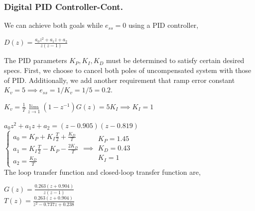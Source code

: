 \documentclass[mathserif, 10pt]{beamer} %
\begin{document}
\frame
{

\small
\frametitle{Digital PID Controller-Cont.}

We can achieve both goals while $e_{ss}=0$ using a PID controller,  \\ \vspace{.07in}

$D(z)= \frac{a_0z^2+a_1z+a_2}{z(z-1)}$ \\ \vspace{.1in}

The PID parameters $K_P,K_I,K_D$  must be determined to satisfy certain desired specs.
First, we choose to cancel both poles of uncompensated system with those of PID. Additionally,
we add another requirement that ramp error constant \\ \vspace{.07in}
 $K_v=5 \implies e_{ss}=1/K_v=1/5=0.2$. \\ \vspace{.07in}

$K_v=\frac{1}{T} \lim\limits_{z\to1}(1-z^{-1})G(z)=5K_I \implies K_I=1$ \\ \vspace{.07in}

$a_0z^2+a_1z+a_2 = (z-0.905)(z-0.819)$\\ \vspace{.07in}
$\left\{\begin{array}{l}
a_0 = K_P+K_I \frac{T}{2}+\frac{K_D}{T}\\
a_1= K_I \frac{T}{2} - K_P-\frac{2K_D}{T}\\
a_2 = \frac{K_D}{T}
\end{array} \implies
\begin{array}{l}
K_P = 1.45\\
K_D = 0.43 \\
K_I=1
\end{array} \right.$\\

The loop transfer function and closed-loop transfer function are, \\ \vspace{.07in}

$G(z) = \frac{0.263(z+0.904)}{z(z-1)}$\\ \vspace{.07in}
$T(z) = \frac{0.263(z+0.904)}{z^2-0.737z+0.238}$

}
\end{document}
